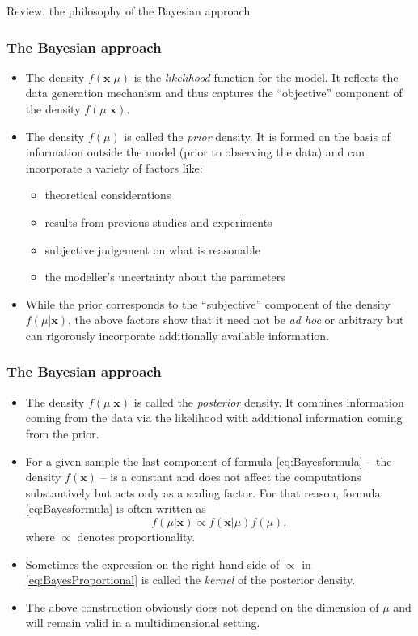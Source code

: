 \documentclass[10pt]{beamer}
\theoremstyle{definition}
\begin{document}
\begin{section}{Review: the philosophy of the Bayesian approach}
\begin{frame}
\frametitle{The Bayesian approach}
\begin{itemize}\itemsep1em
\item The density $ f(\mathbf{x}|\mu) $ is the \emph{likelihood} function for the model. It reflects the data generation mechanism and thus captures the ``objective'' component of the density $f(\mu|\mathbf{x})$.
\item The density $ f(\mu) $ is called the \emph{prior} density. It is formed on the basis of information outside the model (prior to observing the data) and can incorporate a variety of factors like:
	\begin{itemize}\itemsep1em
	\item theoretical considerations
	\item results from previous studies and experiments
	\item subjective judgement on what is reasonable
	\item the modeller's uncertainty about the parameters
	\end{itemize}
\item While the prior corresponds to the ``subjective'' component of the density $f(\mu|\mathbf{x})$, the above factors show that it need not be \emph{ad hoc} or arbitrary but can rigorously incorporate additionally available information.
\end{itemize}
\end{frame}

\begin{frame}
\frametitle{The Bayesian approach}
\begin{itemize}\itemsep1em
\item The density $f(\mu|\mathbf{x})$ is called the \emph{posterior} density. It combines information coming from the data via the likelihood with additional information coming from the prior.
\item For a given sample the last component of formula \eqref{eq:Bayesformula} -- the density $f(\mathbf{x})$ -- is a constant and does not affect the computations substantively but acts only as a scaling factor. For that reason, formula \eqref{eq:Bayesformula} is often written as
\begin{equation}
\label{eq:BayesProportional}f(\mu|\mathbf{x})\propto
f(\mathbf{x}|\mu)f(\mu),
\end{equation}where $\propto$ denotes proportionality.
\item Sometimes the expression on the right-hand side of $ \propto $ in \eqref{eq:BayesProportional} is called the \emph{kernel} of the posterior density.
\item The above construction obviously does not depend on the dimension of $ \mu $ and will remain valid in a multidimensional setting.
\end{itemize}
\end{frame}


\end{section}
\end{document}
